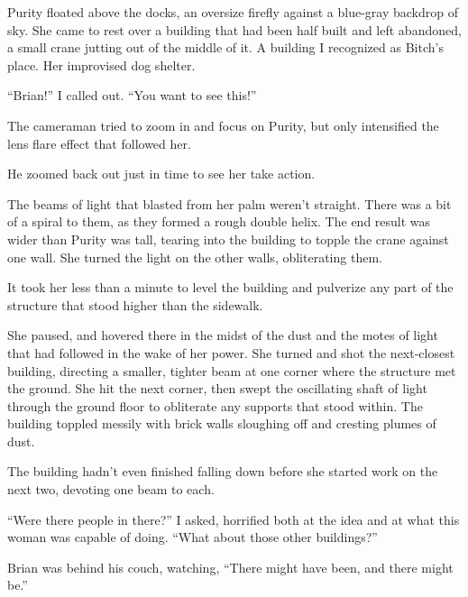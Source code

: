 





Purity floated above the docks, an oversize firefly against a blue-gray backdrop of sky.  She came to rest over a building that had been half built and left abandoned, a small crane jutting out of the middle of it.  A building I recognized as Bitch's place.  Her improvised dog shelter.



``Brian!'' I called out.  ``You want to see this!''



The cameraman tried to zoom in and focus on Purity, but only intensified the lens flare effect that followed her.



He zoomed back out just in time to see her take action.



The beams of light that blasted from her palm weren't straight.  There was a bit of a spiral to them, as they formed a rough double helix.  The end result was wider than Purity was tall, tearing into the building to topple the crane against one wall.  She turned the light on the other walls, obliterating them.



It took her less than a minute to level the building and pulverize any part of the structure that stood higher than the sidewalk.



She paused, and hovered there in the midst of the dust and the motes of light that had followed in the wake of her power.  She turned and shot the next-closest building, directing a smaller, tighter beam at one corner where the structure met the ground.  She hit the next corner, then swept the oscillating shaft of light through the ground floor to obliterate any supports that stood within.  The building toppled messily with brick walls sloughing off and cresting plumes of dust.



The building hadn't even finished falling down before she started work on the next two, devoting one beam to each.



``Were there people in there?'' I asked, horrified both at the idea and at what this woman was capable of doing. ``What about those other buildings?''



Brian was behind his couch, watching, ``There might have been, and there might be.''



